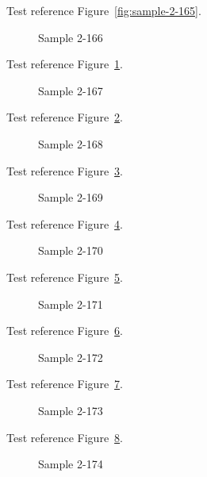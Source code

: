 Test reference Figure~\ref{fig:sample-2-165}.

\begin{figure}[tbhp]
\caption{Sample 2-166}
\label{fig:sample-2-166}
\end{figure}

Test reference Figure~\ref{fig:sample-2-166}.

\begin{figure}[tbhp]
\caption{Sample 2-167}
\label{fig:sample-2-167}
\end{figure}

Test reference Figure~\ref{fig:sample-2-167}.

\begin{figure}[tbhp]
\caption{Sample 2-168}
\label{fig:sample-2-168}
\end{figure}

Test reference Figure~\ref{fig:sample-2-168}.

\begin{figure}[tbhp]
\caption{Sample 2-169}
\label{fig:sample-2-169}
\end{figure}

Test reference Figure~\ref{fig:sample-2-169}.

\begin{figure}[tbhp]
\caption{Sample 2-170}
\label{fig:sample-2-170}
\end{figure}

Test reference Figure~\ref{fig:sample-2-170}.

\begin{figure}[tbhp]
\caption{Sample 2-171}
\label{fig:sample-2-171}
\end{figure}

Test reference Figure~\ref{fig:sample-2-171}.

\begin{figure}[tbhp]
\caption{Sample 2-172}
\label{fig:sample-2-172}
\end{figure}

Test reference Figure~\ref{fig:sample-2-172}.

\begin{figure}[tbhp]
\caption{Sample 2-173}
\label{fig:sample-2-173}
\end{figure}

Test reference Figure~\ref{fig:sample-2-173}.

\begin{figure}[tbhp]
\caption{Sample 2-174}
\label{fig:sample-2-174}
\end{figure}

